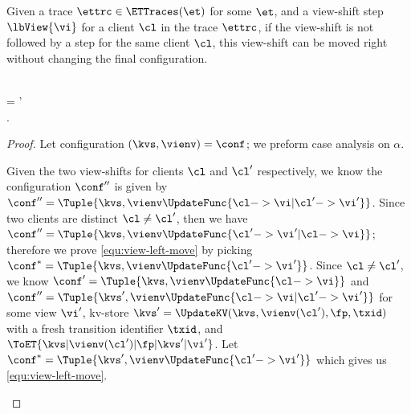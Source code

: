 \begin{toappendix}
\begin{lemma}
\label{lem:view-shift-right-move}
Given a trace \( \ettrc \in \ETTraces(\et) \) for some \( \et \),
and a view-shift step \( \lbView{\vi} \) for a client \( \cl \) in the trace \( \ettrc \),
if the view-shift is not followed by a step for the same client \( \cl \),
this view-shift can be moved right without changing the final configuration.
\begin{Formulae}
\begin{Formula}
    \\ \ettrc =  
    \land \cl \neq \cl'
    \\ \implies \Exists{\conf^* \in \Confs }
    .
    \label{equ:view-left-move}
\end{Formula}
\end{Formulae}
\end{lemma}
\begin{proof}
Let configuration \( (\kvs, \vienv) = \conf \); we preform case analysis on \( \alpha \).
\begin{enumerate}
    Given the two view-shifts for clients \( \cl \) and \( \cl' \) respectively,
    we know the configuration \( \conf'' \)  is given by 
    \( \conf'' = \Tuple{\kvs, \vienv\UpdateFunc{\cl -> \vi | \cl' -> \vi' }} \).
    Since two clients are distinct \( \cl \neq \cl' \), 
    then we have \( \conf'' = \Tuple{\kvs, \vienv\UpdateFunc{ \cl' -> \vi' | \cl -> \vi }} \);
    therefore we prove \cref{equ:view-left-move} by picking \( \conf^* = \Tuple{\kvs, \vienv\UpdateFunc{\cl' -> \vi' }}\).
    \Case{\(\alpha=\fp\)}
    Since \( \cl \neq \cl' \),
    we know \( \conf' = \Tuple{\kvs, \vienv\UpdateFunc{\cl -> \vi }} \) 
    and \( \conf'' = \Tuple{\kvs', \vienv\UpdateFunc{ \cl -> \vi | \cl' -> \vi' }} \)
    for some view \( \vi' \),
    kv-store \( \kvs' = \UpdateKV(\kvs,\vienv(\cl'),\fp,\txid) \) with a fresh transition identifier \( \txid \),
    and \( \ToET{ \kvs | \vienv(\cl') | \fp | \kvs' | \vi' } \).
    Let \( \conf^* = \Tuple{\kvs', \vienv\UpdateFunc{ \cl' -> \vi' }}\) which gives us \cref{equ:view-left-move}. \qedhere
\end{enumerate}
\end{proof}



\end{toappendix}

